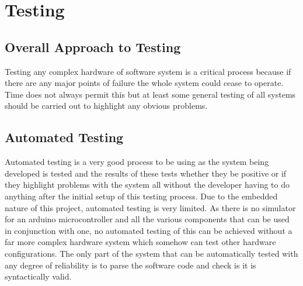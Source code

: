 \chapter{Testing}



\section{Overall Approach to Testing}
Testing any complex hardware of software system is a critical process because if there are any major points of failure the whole system could cease to operate.  Time does not always permit this but at least some general testing of all systems should be carried out to highlight any obvious problems.
\section{Automated Testing}
Automated testing is a very good process to be using as the system being developed is tested and the results of these tests whether they be positive or if they highlight problems with the system all without the developer having to do anything after the initial setup of this testing process.
Due to the embedded nature of this project, automated testing is very limited.  As there is no simulator for an arduino microcontroller and all the various components that can be used in conjunction with one, no automated testing of this can be achieved without a far more complex hardware system which somehow can test other hardware configurations.  The only part of the system that can be automatically tested with any degree of reliability is to parse the software code and check is it is syntactically valid.
